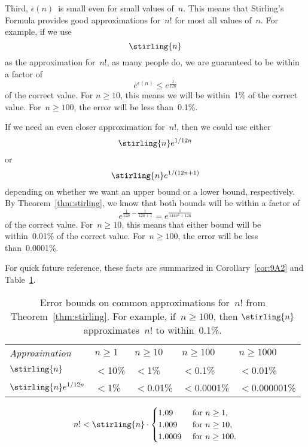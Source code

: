 Third, $\epsilon(n)$~is small even for small values of~$n$.  This
means that Stirling's Formula provides good approximations for~$n!$
for most all values of~$n$.  For example, if we use
\[
    \stirling{n}
\]
as the approximation for~$n!$, as many people do, we are guaranteed
to be within a factor of
\[
    e^{\epsilon(n)} \le e^{\frac{1}{12n}}
\]
of the correct value.  For $n \ge 10$, this means we will be
within~1\% of the correct value.  For~$n \ge 100$, the error will be
less than~0.1\%.

If we need an even closer approximation for~$n!$, then we could use
either
\[
    \stirling{n} e^{1/12n}
\]
or
\[
    \stirling{n} e^{1/(12n + 1)}
\]
depending on whether we want an upper bound or a lower bound,
respectively.  By Theorem~\ref{thm:stirling}, we know that both bounds
will be within a factor of
\[
    e^{ \frac{1}{12n} - \frac{1}{12n + 1} } = e^{\frac{1}{144n^2 + 12n }}
\]
of the correct value.  For~$n \ge 10$, this means that either bound
will be within~0.01\% of the correct value.  For~$n \ge 100$, the
error will be less than~0.0001\%.

For quick future reference, these facts are summarized in
Corollary~\ref{cor:9A2} and Table~\ref{fig:9A1}.

\begin{table}\redrawntrue

\renewcommand{\arraystretch}{1.5}

\begin{tabular}{l|llll}

\multicolumn{1}{l}{\emph{Approximation}}
    & $n \ge 1$
    & $n \ge 10$
    & $n \ge 100$
    & $n \ge 1000$ \\
\cline{2-5}
$\stirling{n}$
    & ${}<{}$10\%
    & ${}<{}$1\%
    & ${}<{}$0.1\%
    & ${}<{}$0.01\%\\

$\stirling{n} e^{1/12n}$
    & ${}<{}$1\%
    & ${}<{}$0.01\%
    & ${}<{}$0.0001\%
    & ${}<{}$0.000001\%
\end{tabular}

\caption{Error bounds on common approximations for~$n!$ from
  Theorem~\ref{thm:stirling}.  For example, if~$n \ge 100$, then
  $\protect\stirling{n}$ approximates~$n!$ to within~0.1\%.}

\label{fig:9A1}

\end{table}

\begin{corollary}\label{cor:9A2}
\begin{align*}
n! < \stirling{n} \cdot
 \begin{cases}
1.09 & \text{ for }   n \ge 1,\\
1.009 & \text{ for }  n \ge 10,\\
1.0009 & \text{ for } n \ge 100.
\end{cases}
\end{align*}

\iffalse

For $n \ge 1$,
\[
    n! < 1.09 \stirling{n}.
\]
For $n \ge 10$,
\[
    n! < 1.009 \stirling{n}.
\]
For $n \ge 100$,
\[
    n! < 1.0009 \stirling{n}.
\]
\fi

\end{corollary}


